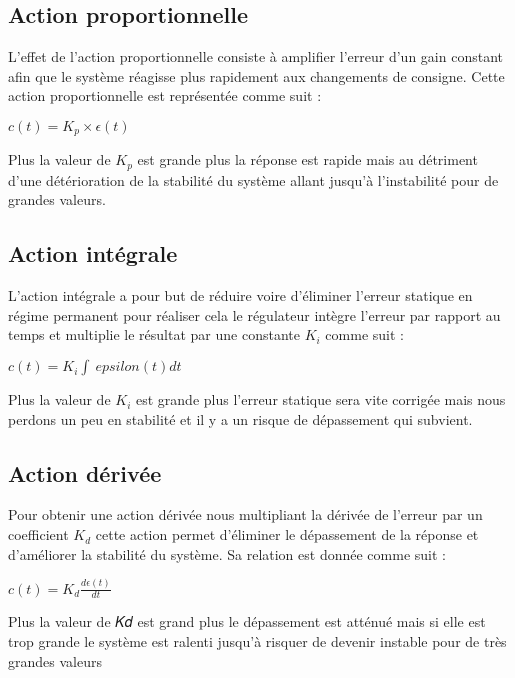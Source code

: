 \documentclass[a4paper,12pt]{report}
\begin{document}
\subsection {Action proportionnelle}
L’effet de l’action proportionnelle consiste à amplifier l’erreur d’un gain constant afin que le
système réagisse plus rapidement aux changements de consigne. Cette action proportionnelle est
représentée comme suit :

$ c(𝑡) = 𝐾_𝑝  \times \epsilon(t) $


Plus la valeur de $𝐾_𝑝 $ est grande plus la réponse est rapide mais au détriment d’une détérioration
de la stabilité du système allant jusqu’à l’instabilité pour de grandes valeurs.




\subsection  {Action intégrale}
L’action intégrale a pour but de réduire voire d’éliminer l’erreur statique en régime permanent
pour réaliser cela le régulateur intègre l’erreur par rapport au temps et multiplie le résultat par une
constante $K_i$ comme suit :

$ c(𝑡) = K_i \int\ epsilon(t) dt $


Plus la valeur de $K_i$ est grande plus l’erreur statique sera vite corrigée mais nous perdons un peu
en stabilité et il y a un risque de dépassement qui subvient.

\subsection  {Action dérivée}
Pour obtenir une action dérivée nous multipliant la dérivée de l’erreur par un coefficient $ K_d $
cette action permet d’éliminer le dépassement de la réponse et d’améliorer la stabilité du système. Sa
relation est donnée comme suit :

$ c(𝑡) = K_d \frac{d\epsilon(t)}{dt} $


Plus la valeur de 𝐾𝑑 est grand plus le dépassement est atténué mais si elle est trop grande le
système est ralenti jusqu’à risquer de devenir instable pour de très grandes valeurs
	
	
\end{document}
